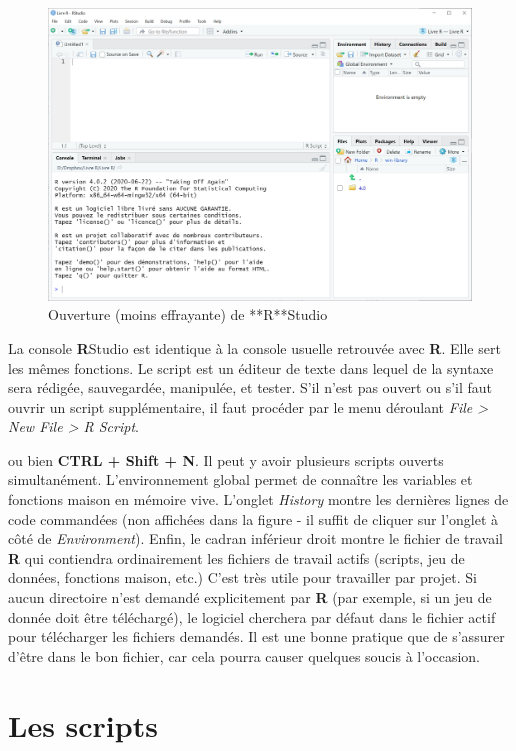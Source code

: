 \documentclass[
]{book}
\begin{document}
\begin{figure}

{\centering \includegraphics[width=0.75\linewidth]{image//ConsoleRStudio} 

}

\caption{Ouverture (moins effrayante) de **R**Studio}\label{fig:ConsoleRStudio}
\end{figure}

La console \textbf{R}Studio est identique à la console usuelle retrouvée avec \textbf{R}. Elle sert les mêmes fonctions. Le script est un éditeur de texte dans lequel de la syntaxe sera rédigée, sauvegardée, manipulée, et tester. S'il n'est pas ouvert ou s'il faut ouvrir un script supplémentaire, il faut procéder par le menu déroulant \emph{File \textgreater{} New File \textgreater{} R Script}.

ou bien \textbf{CTRL + Shift + N}. Il peut y avoir plusieurs scripts ouverts simultanément. L'environnement global permet de connaître les variables et fonctions maison en mémoire vive. L'onglet \emph{History} montre les dernières lignes de code commandées (non affichées dans la figure - il suffit de cliquer sur l'onglet à côté de \emph{Environment}). Enfin, le cadran inférieur droit montre le fichier de travail \textbf{R} qui contiendra ordinairement les fichiers de travail actifs (scripts, jeu de données, fonctions maison, etc.) C'est très utile pour travailler par projet. Si aucun directoire n'est demandé explicitement par \textbf{R} (par exemple, si un jeu de donnée doit être téléchargé), le logiciel cherchera par défaut dans le fichier actif pour télécharger les fichiers demandés. Il est une bonne pratique que de s'assurer d'être dans le bon fichier, car cela pourra causer quelques soucis à l'occasion.

\hypertarget{les-scripts}{%
\section{Les scripts}\label{les-scripts}}
\end{document}
